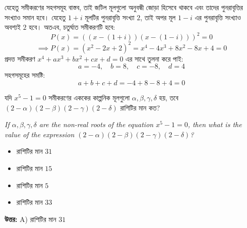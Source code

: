 \documentclass[12pt, a4paper]{article}
\begin{document}
\begin{tcolorbox}[solutionbox={সমাধান (Solution)}]
    \noindent
    যেহেতু সমীকরণের সহগসমূহ বাস্তব, তাই জটিল মূলগুলো অনুবন্ধী জোড়া হিসেবে থাকবে এবং তাদের পুনরাবৃত্তির সংখ্যাও সমান হবে। 
    যেহেতু $1+i$ মূলটির পুনরাবৃত্তি সংখ্যা $2$, তাই অপর মূল $1-i$ এর পুনরাবৃত্তি সংখ্যাও অবশ্যই $2$ হবে। 
    অতএব, চতুর্ঘাত সমীকরণটি হবে:
    \[ P(x) = ((x - (1+i))(x - (1-i)))^2 = 0 \]
    \[ \implies P(x) = (x^2 - 2x + 2)^2 = x^4 - 4x^3 + 8x^2 - 8x + 4 = 0 \]
    প্রদত্ত সমীকরণ $x^4 + ax^3 + bx^2 + cx + d = 0$ এর সাথে তুলনা করে পাই:
    \[ a = -4, \quad b = 8, \quad c = -8, \quad d = 4 \]
    সহগসমূহের সমষ্টি:
    \[ a + b + c + d = -4 + 8 - 8 + 4 = 0 \]
\end{tcolorbox}
\begin{tcolorbox}[questionbox={প্রশ্ন (Question) 50}]
    \noindent
    যদি $x^5 - 1 = 0$ সমীকরণের এককের কাল্পনিক মূলগুলো $\alpha, \beta, \gamma, \delta$ হয়, তবে $(2-\alpha)(2-\beta)(2-\gamma)(2-\delta)$ রাশিটির মান কত?
    
    \vspace{0.8em}
    \begin{english}
    \noindent\textit{\color{darkgray}
    If $\alpha, \beta, \gamma, \delta$ are the non-real roots of the equation $x^5 - 1 = 0$, then what is the value of the expression $(2-\alpha)(2-\beta)(2-\gamma)(2-\delta)$?
    }
    \end{english}
\end{tcolorbox}

\begin{itemize}[label={}, leftmargin=1cm, itemsep=0.5em]
    \item[\textbf{A)}] রাশিটির মান $31$
    \item[\textbf{B)}] রাশিটির মান $15$
    \item[\textbf{C)}] রাশিটির মান $5$
    \item[\textbf{D)}] রাশিটির মান $33$
\end{itemize}

\vspace{0.5em}
\begin{tcolorbox}[answerbox]
    \textbf{\color{success} উত্তর:} A) রাশিটির মান $31$
\end{tcolorbox}
\vspace{1em}
\end{document}
